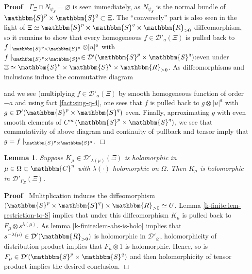 \documentclass{article}
\renewenvironment{proof}{\noindent\textbf{Proof\ }}{\hspace*{\fill}$\Box$\medskip}
\newtheorem{lemma}[proposition]{Lemma}
\theoremstyle{remark}
\newcommand{\C}{\ensuremath{\mathbbm{C}}}
\begin{document}
\begin{proof}
  $\Gamma_{\Xi} \cap N_{\psi_S} = \varnothing$ is seen immediately, as
  $N_{\psi_S}$ is the normal bundle of $\mathbbm{S}^p \times \mathbbm{S}^q
  \subset \Xi$. The ``conversely'' part is also seen in the light of $\Xi
  \simeq \mathbbm{S}^p \times \mathbbm{S}^q \times \mathbbm{R}_{> 0}$
  diffeomorphism, so it remains to show that every homogeneous $f \in
  \mathcal{D}'_a (\Xi)$ is pulled back to $f \mid_{\mathbbm{S}^p \times
  \mathbbm{S}^q} \otimes | u |^a$ with $f \mid_{\mathbbm{S}^p \times
  \mathbbm{S}^q} \in \mathcal{D}' (\mathbbm{S}^p \times \mathbbm{S}^q)$:even
  under $\Xi \simeq \mathbbm{S}^p \times \mathbbm{S}^q \times \mathbbm{R}_{>
  0}$. As diffeomorphisms and inclusions induce the commutative diagram
  \centerline{ }%
  and we see (multiplying $f \in \mathcal{D}'_a (\Xi)$ by smooth homogeneous
  function of order $- a$ and using fact \ref{fact:sing-q-4}, one sees that
  $f$ is pulled back to $g \otimes | u |^a$ with $g \in \mathcal{D}'
  (\mathbbm{S}^p \times \mathbbm{S}^q)$ even. Finally, aprroximating $g$ with
  even smooth elements of $C^{\infty} (\mathbbm{S}^p \times \mathbbm{S}^q)$,
  we see that commutativity of above diagram and continuity of pullback and
  tensor imply that $g = f \mid_{\mathbbm{S}^p \times \mathbbm{S}^q}$.
\end{proof}

\begin{lemma}
  \label{k-finite:lem-holo-easy}Suppose $K_{\mu} \in \mathcal{D}'_{\lambda
  (\mu)} (\Xi)$ is holomorphic in $\mu \in \Omega \subset \mathbbm{C}^n$ with
  $\lambda (\cdot)$ holomorphic on $\Omega$. Then $K_{\mu}$ is holomorphic in
  $\mathcal{D}'_{\Gamma_{\Xi}} (\Xi)$.
\end{lemma}

\begin{proof}
  Mulitplication induces the diffeomorphism $(\mathbbm{S}^p \times
  \mathbbm{S}^q) \times \mathbbm{R}_{> 0} \simeq U$. Lemma
  \ref{k-finite:lem-restriction-to-S} implies that under this diffeomorphism
  $K_{\mu}$ is pulled back to $F_{\mu} \otimes s^{\lambda (\mu)}$. As lemma
  \ref{k-finite:lem-abs-is-holo} implies that $s^{- \lambda (\mu)} \in
  \mathcal{D}' (\mathbbm{R}_{> 0})$ is holomorphic in
  $\mathcal{D}'_{\varnothing}$, holomorphicity of distribution product implies
  that $F_{\mu} \otimes 1$ is holomorphic. Hence, so is $F_{\mu} \in
  \mathcal{D}' (\mathbbm{S}^p \times \mathbbm{S}^q)$ and then holomorphicity
  of tensor product implies the desired conclusion.
\end{proof}
\end{document}
